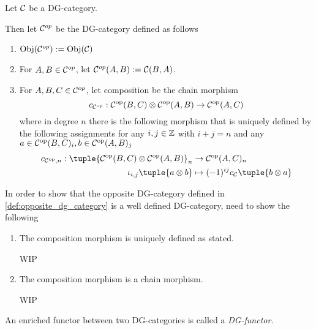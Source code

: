 \begin{definition}
    \label{def:opposite_dg_category}
    Let \( {\mathcal{C}} \) be a DG-category.

    Then let \( {\mathcal{C}}^{op} \) be the DG-category defined as follows
    \begin{enumerate}
        \item {
            \( \operatorname{Obj}({\mathcal{C}}^{op}) := \operatorname{Obj}({\mathcal{C}}) \)
        }
        \item {
            For \( A, B \in {\mathcal{C}}^{op} \), let \( {\mathcal{C}}^{op}(A, B) := {\mathcal{C}}(B, A) \).
        }
        \item {
            For \( A, B, C \in {\mathcal{C}}^{op} \), let composition be the chain morphism
            \[
                c_{{\mathcal{C}}^{\operatorname{op}}}: {\mathcal{C}}^{\operatorname{op}} (B, C) \otimes {\mathcal{C}}^{\operatorname{op}} (A, B) \to {\mathcal{C}}^{\operatorname{op}} (A, C)
            \]
            where in degree \( n \) there is the following morphism that is uniquely defined by the following assignments for any \( i, j \in {\mathbb{Z}} \) with \( i + j = n \) and any \( a \in {\mathcal{C}}^{\operatorname{op}} (B, C)_i, b \in {\mathcal{C}}^{\operatorname{op}} (A, B)_j \)
            \begin{align*}
                c_{\Cc^{\op}, n}: \tuple{ \Cc^{\op} (B, C) \otimes \Cc^{\op} (A, B) }_n &\to \Cc^{\op} (A, C)_n \\
                \iota_{i, j}\tuple{ a \otimes b } &\mapsto (-1)^{ij} c_\Cc \tuple{ b \otimes a }
            \end{align*}
        }
    \end{enumerate}
\end{definition}
\begin{remark}
    In order to show that the opposite DG-category defined in \autoref{def:opposite_dg_category} is a well defined DG-category, need to show the following
    \begin{enumerate}
        \item  {
            The composition morphism is uniquely defined as stated.

            WIP
        }
        \item {
            The composition morphism is a chain morphism.

            WIP
        }
    \end{enumerate}
\end{remark}

\begin{definition}[DG-functor]
    An enriched functor between two DG-categories is called a \emph{DG-functor}.
\end{definition}

